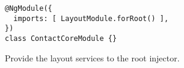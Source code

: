 \ifshowListings
\begin{listing}[H]
  \begin{verbatim}
@NgModule({
  imports: [ LayoutModule.forRoot() ],
})
class ContactCoreModule {}
  \end{verbatim}
  \caption{Provide the layout services to the root injector.}\label{code:applied-methods:communication-patterns:importing-the-root-layout-module}
\end{listing}
\fi
